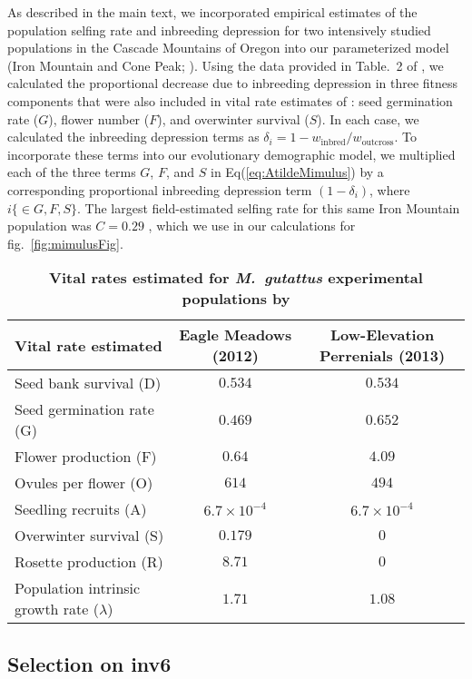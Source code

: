\documentclass[11pt,draft]{article}
\begin{document}
As described in the main text, we incorporated empirical estimates of the population selfing rate and inbreeding depression for two intensively studied populations in the Cascade Mountains of Oregon into our parameterized model (Iron Mountain and Cone Peak; \citealt{Willis1993,Willis1999a,Willis1999b}). Using the data provided in Table.~2 of \citet{Willis1993}, we calculated the proportional decrease due to inbreeding depression in three fitness components that were also included in vital rate estimates of \citet{PetersonEtAl2016}: seed germination rate ($G$), flower number ($F$), and overwinter survival ($S$). In each case, we calculated the inbreeding depression terms as $\delta_i = 1 - w_{\text{inbred}}/w_{\text{outcross}}$. To incorporate these terms into our evolutionary demographic model, we multiplied each of the three terms $G$, $F$, and $S$ in Eq(\ref{eq:AtildeMimulus}) by a corresponding proportional inbreeding depression term $(1 - \delta_i)$, where $i \{\in G,F,S\}$. The largest field-estimated selfing rate for this same Iron Mountain population was $C = 0.29$ \citep{Willis1993}, which we use in our calculations for fig.~\ref{fig:mimulusFig}.


\begin{table}[htbp]
 \centering
 \caption{\bf Vital rates estimated for {\itshape M.~gutattus} experimental populations by \citet{PetersonEtAl2016}}
\label{tab:MimDemData}
\begin{tabular}{lcc}
 \toprule
 Vital rate estimated &  Eagle Meadows (2012) & Low-Elevation Perrenials (2013)\\ \hline
 Seed bank survival (D) & $0.534$ & $0.534$ \\
 Seed germination rate (G) & $0.469$ & $0.652$ \\
 Flower production (F) & $0.64$ & $4.09$ \\
 Ovules per flower (O) & $614$ & $494$ \\
 Seedling recruits (A) & $6.7 \times 10^{-4}$ & $6.7 \times 10^{-4}$ \\
 Overwinter survival (S) & $0.179$ & $0$ \\
 Rosette production (R) & $8.71$ & $0$ \\
\hline
 Population intrinsic growth rate ($\lambda$) & $1.71$ & $1.08$ \\
 \hline
\end{tabular}
\end{table}


\subsection*{Selection on inv6}
\end{document}

